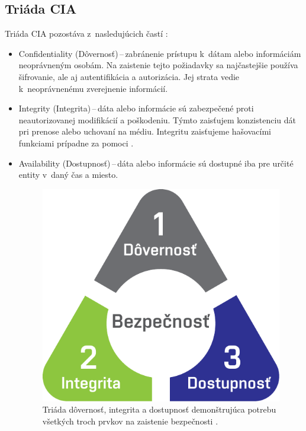 \subsection{Triáda CIA}
Triáda CIA pozostáva z~nasledujúcich častí \cite{McMillan2018}: 
\begin{itemize}
	\item Confidentiality (Dôvernosť)\,--\,zabránenie prístupu k~dátam alebo informáciám neoprávneným osobám. Na zaistenie tejto požiadavky sa najčastejšie používa šifrovanie, ale aj autentifikácia a autorizácia. Jej strata vedie k~neoprávnenému zverejnenie informácií. 
	
	\item Integrity (Integrita)\,--\,dáta alebo informácie sú zabezpečené proti neautorizovanej modifikácií a poškodeniu. Týmto zaisťujem konzistenciu dát pri prenose alebo uchovaní na médiu. Integritu zaisťujeme hašovacími funkciami prípadne za pomoci . 
	
	\item Availability (Dostupnosť)\,--\,dáta alebo informácie sú dostupné iba pre určité entity v~daný čas a miesto. 

	\begin{figure}[!h]
		\begin{center}
			\includegraphics[scale=0.6]{obrazky/cia.pdf}
		\end{center}
		\caption[Triáda dôvernosť, integrita a dostupnosť]{Triáda dôvernosť, integrita a dostupnosť demonštrujúca potrebu všetkých troch prvkov na zaistenie bezpečnosti \cite{Vyncke2008}.}%
\label{cia}
\end{figure}
\end{itemize}

